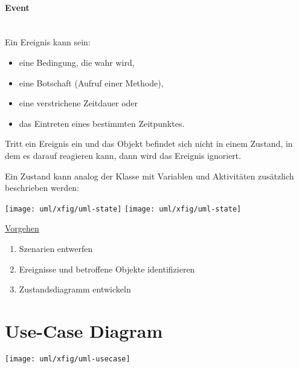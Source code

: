 \begin{minipage}[c]{0.45\linewidth}
\paragraph{Event}\ \\[2ex]
Ein Ereignis kann sein:
\begin{itemize}
\item eine Bedingung, die wahr wird,
\item eine Botschaft (Aufruf einer Methode),
\item eine verstrichene Zeitdauer oder
\item das Eintreten eines bestimmten Zeitpunktes.
\end{itemize}
Tritt ein Ereignis ein und das Objekt befindet sich
nicht in einem Zustand, in dem es darauf reagieren kann,
dann wird das Ereignis ignoriert.

Ein Zustand kann analog der Klasse mit Variablen und Aktivitäten
zusätzlich beschrieben werden:
\begin{center}
\ifslides
\texttt{[image: uml/xfig/uml-state]}
\else
\texttt{[image: uml/xfig/uml-state]}
\fi
\end{center}
\underline{Vorgehen}
\begin{enumerate}
\item Szenarien entwerfen
\item Ereignisse und betroffene Objekte identifizieren
\item Zustandsdiagramm entwickeln
\end{enumerate}
\newpage
\section{Use-Case Diagram}
\begin{center}
\texttt{[image: uml/xfig/uml-usecase]}
\end{center}


\end{minipage}
